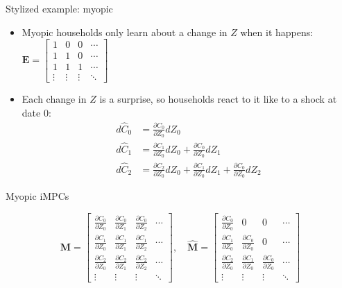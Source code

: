 \documentclass[10pt,english]{beamer}
\begin{document}
%
\begin{frame}{Stylized example: myopic}
\begin{itemize}
\item <+->Myopic households only learn about a change in $Z$ when it happens: $\boldsymbol{E}=\left[\begin{smallmatrix}1 & 0 & 0 & \cdots\\
1 & 1 & 0 & \cdots\\
1 & 1 & 1 & \cdots\\
\vdots & \vdots & \vdots & \ddots
\end{smallmatrix}\right]$
\item <+->Each change in $Z$ is a surprise, so households react to it like to a shock at date 0:
\begin{align*}
d\hat{C}_{0} & =\frac{\partial C_{0}}{\partial Z_{0}}dZ_{0}\\
d\hat{C}_{1} & =\frac{\partial C_{1}}{\partial Z_{0}}dZ_{0}+\frac{\partial C_{0}}{\partial Z_{0}}dZ_{1}\\
d\hat{C}_{2} & =\frac{\partial C_{2}}{\partial Z_{0}}dZ_{0}+\frac{\partial C_{1}}{\partial Z_{0}}dZ_{1}+\frac{\partial C_{0}}{\partial Z_{0}}dZ_{2}
\end{align*}
\end{itemize}
\end{frame}
%
\begin{frame}{Myopic iMPCs}

\[
\boldsymbol{M}=\begin{bmatrix}\frac{\partial C_{0}}{\partial Z_{0}} & \frac{\partial C_{0}}{\partial Z_{1}} & \frac{\partial C_{0}}{\partial Z_{2}} & \cdots\\
\frac{\partial C_{1}}{\partial Z_{0}} & \frac{\partial C_{1}}{\partial Z_{1}} & \frac{\partial C_{1}}{\partial Z_{2}} & \cdots\\
\frac{\partial C_{2}}{\partial Z_{0}} & \frac{\partial C_{2}}{\partial Z_{1}} & \frac{\partial C_{2}}{\partial Z_{2}} & \cdots\\
\vdots & \vdots & \vdots & \ddots
\end{bmatrix},\quad\hat{\boldsymbol{M}}=\begin{bmatrix}\frac{\partial C_{0}}{\partial Z_{0}} & 0 & 0 & \cdots\\
\frac{\partial C_{1}}{\partial Z_{0}} & \frac{\partial C_{0}}{\partial Z_{0}} & 0 & \cdots\\
\frac{\partial C_{2}}{\partial Z_{0}} & \frac{\partial C_{1}}{\partial Z_{0}} & \frac{\partial C_{0}}{\partial Z_{0}} & \cdots\\
\vdots & \vdots & \vdots & \ddots
\end{bmatrix}
\]


\end{frame}
\end{document}
